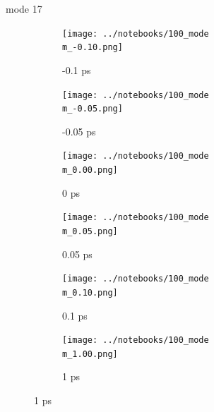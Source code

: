 \documentclass{beamer}
\begin{document}
\renewcommand\m{17}
\begin{frame}{mode \m}
	\begin{figure}
		\centering
		\begin{subfigure}[b]{\w\textwidth}
			\centering
			\texttt{[image: ../notebooks/100\_mode\\m\_-0.10.png]}
			\caption{-0.1 ps}
		\end{subfigure}
		\begin{subfigure}[b]{\w\textwidth}
			\centering
			\texttt{[image: ../notebooks/100\_mode\\m\_-0.05.png]}
			\caption{-0.05 ps}
		\end{subfigure}
		\begin{subfigure}[b]{\w\textwidth}
			\centering
			\texttt{[image: ../notebooks/100\_mode\\m\_0.00.png]}
			\caption{0 ps}
		\end{subfigure}
		\begin{subfigure}[b]{\w\textwidth}
			\centering
			\texttt{[image: ../notebooks/100\_mode\\m\_0.05.png]}
			\caption{0.05 ps}
		\end{subfigure}
		\begin{subfigure}[b]{\w\textwidth}
			\centering
			\texttt{[image: ../notebooks/100\_mode\\m\_0.10.png]}
			\caption{0.1 ps}
		\end{subfigure}
		\begin{subfigure}[b]{\w\textwidth}
			\centering
			\texttt{[image: ../notebooks/100\_mode\\m\_1.00.png]}
			\caption{1 ps}
		\end{subfigure}
	\end{figure}
\end{frame}
\end{document}
